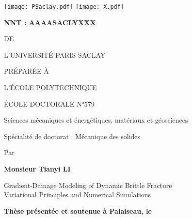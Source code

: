 
\begin{titlepage}

\begin{flushleft}
\texttt{[image: PSaclay.pdf]} \hfill
\texttt{[image: X.pdf]}
\end{flushleft}
\vspace{10pt}

\begin{mdframed}
\begin{flushleft}
\large\textbf{NNT : AAAASACLYXXX}
\end{flushleft}
\vspace{20pt}

\begin{center}
{\color{color02}{\LARGE THÈSE DE DOCTORAT}

\vspace{8pt}
{\LARGE DE}

\vspace{8pt}
{\LARGE L'UNIVERSITÉ PARIS-SACLAY}

\vspace{8pt}
{\LARGE PRÉPARÉE À}

\vspace{8pt}
{\LARGE L'ÉCOLE POLYTECHNIQUE}}

\vspace{24pt}
{\Large ÉCOLE DOCTORALE N°579}

\vspace{5pt}
{\Large Sciences mécaniques et énergétiques, matériaux et géosciences}

\vspace{16pt}
{\Large Spécialité de doctorat : Mécanique des solides}
\vspace{12pt}

{\large Par}
\vspace{12pt}

{\LARGE\bfseries Monsieur Tianyi LI}
\vspace{20pt}

{\LARGE \sffamily
Gradient-Damage Modeling of Dynamic Brittle Fracture \\ \vspace{0.2cm}
Variational Principles and Numerical Simulations}
\end{center}

\vfill
\begin{flushleft}
\large
\textbf{Thèse présentée et soutenue à Palaiseau, le}
\vspace{15pt}


\end{flushleft}
\end{mdframed}
\end{titlepage}
